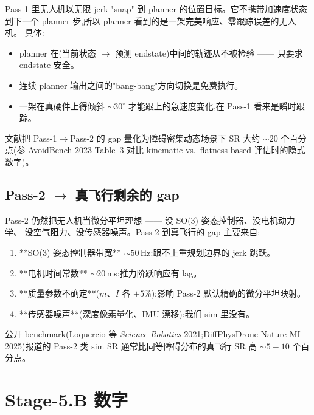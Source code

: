 \documentclass[UTF8, 11pt]{ctexart}
\begin{document}
Pass-1 里无人机以无限 jerk "snap" 到 planner 的位置目标。它不携带加速度状态
到下一个 planner 步,所以 planner 看到的是一架完美响应、零跟踪误差的无人机。
具体:

\begin{itemize}
  \item planner 在(当前状态 $\to$ 预测 endstate)中间的轨迹从不被检验 —— 只要求 endstate 安全。
  \item 连续 planner 输出之间的"bang-bang"方向切换是免费执行。
  \item 一架在真硬件上得倾斜 ${\sim}30^\circ$ 才能跟上的急速度变化,在 Pass-1 看来是瞬时跟踪。
\end{itemize}

文献把 Pass-1$\to$Pass-2 的 gap 量化为障碍密集动态场景下 SR 大约 ${\sim}20$
个百分点(参 \href{https://arxiv.org/abs/2301.07430}{AvoidBench 2023} Table~3
对比 kinematic vs.\ flatness-based 评估时的隐式数字)。

\subsection{Pass-2 $\to$ 真飞行剩余的 gap}

Pass-2 仍然把无人机当微分平坦理想 —— 没 SO(3) 姿态控制器、没电机动力学、
没空气阻力、没传感器噪声。Pass-2 到真飞行的 gap 主要来自:

\begin{enumerate}
  \item **SO(3) 姿态控制器带宽** ${\sim}50\,$Hz:跟不上重规划边界的 jerk 跳跃。
  \item **电机时间常数** ${\sim}20\,$ms:推力阶跃响应有 lag。
  \item **质量参数不确定**($m$、$I$ 各 ${\pm}5\%$):影响 Pass-2 默认精确的微分平坦映射。
  \item **传感器噪声**(深度像素量化、IMU 漂移):我们 sim 里没有。
\end{enumerate}

公开 benchmark(Loquercio 等 \emph{Science Robotics} 2021;DiffPhysDrone Nature MI 2025)报道的 Pass-2 类 sim SR 通常比同等障碍分布的真飞行 SR 高 ${\sim}5{-}10$ 个百分点。

\section{Stage-5.B 数字}
\end{document}
